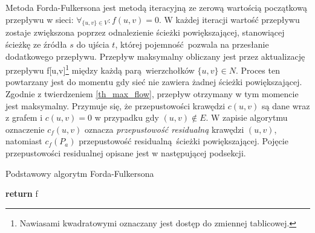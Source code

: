 \par{
  Metoda Forda-Fulkersona jest metodą iteracyjną ze zerową wartością początkową przepływu w sieci: $\forall_{\{u,v\}\in V}: f(u,v)=0$.
  W każdej iteracji wartość przepływu zostaje zwiększona poprzez odnalezienie ścieżki powiększającej, stanowiącej ścieżkę ze źródła $s$ do ujścia $t$, której pojemność pozwala na przesłanie dodatkowego przepływu.
  Przepływ maksymalny obliczany jest przez aktualizację przepływu f[u,v]\footnote{Nawiasami kwadratowymi oznaczany jest dostęp do zmiennej tablicowej.} między każdą parą wierzchołków $\{u,v\} \in N$.
  Proces ten powtarzany jest do momentu gdy sieć nie zawiera żadnej ścieżki powiększającej.
  Zgodnie z twierdzeniem \ref{th_max_flow}, przepływ otrzymany w tym momencie jest maksymalny.
  Przymuje się, że przepustowości krawędzi $c(u, v)$ są dane wraz z grafem i $c(u, v)=0$ w przypadku gdy $(u, v) \notin E$.
  W zapisie algorytmu oznaczenie $c_f(u, v)$ oznacza \emph{przepustowość residualną} krawędzi $(u, v)$, natomiast $c_f(P_a)$ przepustowość residualną ścieżki powiększającej.
  Pojęcie przepustowości residualnej opisane jest w następującej podsekcji.
  \begin{algorithm}
    \caption{Podstawowy algorytm Forda-Fulkersona}\label{alg_fordFulkerson}
    \begin{algorithmic}[1]



        \Do
        \EndFor
          \Do
            \Do
          \EndFor
        \EndWhile
        \State\textbf{return} f
      \EndFunction
  \end{algorithmic}
  \end{algorithm}
}
